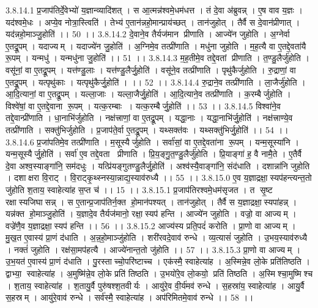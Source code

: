 3.8.14.1
प्र॒जाप॑तिर्दे॒वेभ्यो॑ य॒ज्ञान्व्यादि॑शत् । स आ॒त्मन्न॑श्वमे॒धम॑धत्त । तं दे॒वा अ॑ब्रुवन्न् । ए॒ष वाव य॒ज्ञः । यद॑श्वमे॒धः । अप्ये॒व नोत्रा॒स्त्विति॑ । तेभ्य॑ ए॒तान॑न्नहो॒मान्प्राय॑च्छत् । तान॑जुहोत् । तैर्वै स दे॒वान॑प्रीणात् । यद॑न्नहो॒माञ्जु॒होति॑ ।। 50 ।।
3.8.14.2
दे॒वाने॒व तैर्यज॑मान प्रीणाति । आज्ये॑न जुहोति । अ॒ग्नेर्वा ए॒तद्रू॒पम् । यदाज्यम् । यदाज्ये॑न जु॒होति॑ । अ॒ग्निमे॒व तत्प्री॑णाति । मधु॑ना जुहोति । म॒ह॒त्यै वा ए॒तद्दे॒वता॑यै रू॒पम् । यन्मधु॑ । यन्मधु॑ना जु॒होति॑ ।। 51 ।।
3.8.14.3
म॒ह॒तीमे॒व तद्दे॒वतां प्रीणाति । त॒ण्डु॒लैर्जु॑होति । वसू॑नां॒ वा ए॒तद्रू॒पम् । यत्त॑ण्डु॒लाः । यत्त॑ण्डु॒लैर्जु॒होति॑ । वसू॑ने॒व तत्प्री॑णाति । पृथु॑कैर्जुहोति । रु॒द्राणां॒ वा ए॒तद्रू॒पम् । यत्पृथु॑काः । यत्पृथु॑कैर्जु॒होति॑ । ।। 52 ।।
3.8.14.4
रु॒द्राने॒व तत्प्री॑णाति । ला॒जैर्जु॑होति । आ॒दि॒त्यानां॒ वा ए॒तद्रू॒पम् । यल्ला॒जाः । यल्ला॒जैर्जु॒होति॑ । आ॒दि॒त्याने॒व तत्प्री॑णाति । क॒रम्बैर्जुहोति । विश्वे॑षां॒ वा ए॒तद्दे॒वाना॑ रू॒पम् । यत्क॒रम्बाः । यत्क॒रम्बैर्जु॒होति॑ ।। 53 ।।
3.8.14.5
विश्वा॑ने॒व तद्दे॒वान्प्री॑णाति । धा॒नाभि॑र्जुहोति । नक्ष॑त्त्राणां॒ वा ए॒तद्रू॒पम् । यद्धा॒नाः । यद्धा॒नाभि॑र्जु॒होति॑ । नक्ष॑त्त्राण्ये॒व तत्प्री॑णाति । सक्तु॑भिर्जुहोति । प्र॒जाप॑ते॒र्वा ए॒तद्रू॒पम् । यथ्सक्त॑वः । यथ्सक्तु॑भिर्जु॒होति॑ ।। 54 ।।
3.8.14.6
प्र॒जा॑पतिमे॒व तत्प्री॑णाति । म॒सूस्यैर्जुहोति । सर्वा॑सां॒ वा ए॒तद्दे॒वता॑ना रू॒पम् । यन्म॒सूस्या॑नि । यन्म॒सूस्यैर्जु॒होति॑ । सर्वा॑ ए॒व तद्दे॒वता प्रीणाति । प्रि॒य॒ङ्गु॒त॒ण्डु॒लैर्जु॑होति । प्रि॒याङ्गा॑ ह॒ वै नामै॒ते । ए॒तैर्वै दे॒वा अश्व॒स्याङ्गा॑नि॒ सम॑दधुः । यत्प्रि॑यङ्गुतण्डु॒लैर्जु॒होति॑ । अश्व॑स्यै॒वाङ्गा॑नि॒ संद॑धाति । दशान्ना॑नि जुहोति । दशाक्षरा वि॒राट् । वि॒राट्कृ॒थ्स्नस्या॒न्नाद्य॒स्याव॑रुध्यै ।। 55 ।।
3.8.15.0
ए॒व य॒ज्ञाद्रक्षा॒॒स्यप॑हन्त्यन्त॒तो जु॑होति श॒ताय॒ स्वाहेत्या॑ह स॒प्त च॑ ।। 15 ।।
3.8.15.1
प्र॒जाप॑तिरश्वमे॒धम॑सृजत । त सृ॒ष्ट रक्षा॑स्यजिघासन्न् । स ए॒तान्प्र॒जाप॑तिर्न॒क्त हो॒मान॑पश्यत् । तान॑जुहोत् । तैर्वै स य॒ज्ञाद्रक्षा॒॒स्यपा॑हन्न् । यन्न॑क्त हो॒माञ्जु॒होति॑ । य॒ज्ञादे॒व तैर्यज॑मानो॒ रक्षा॒॒स्यप॑ हन्ति । आज्ये॑न जुहोति । वज्रो॒ वा आज्यम् । वज्रे॑णै॒व य॒ज्ञाद्रक्षा॒॒स्यप॑ हन्ति ।। 56 ।।
3.8.15.2
आज्य॑स्य प्रति॒पदं॑ करोति । प्रा॒णो वा आज्यम् । मु॒ख॒त ए॒वास्य॑ प्रा॒णं द॑धाति । अ॒न्न॒हो॒माञ्जु॑होति । शरी॑रवदे॒वाव॑ रुन्धे । व्य॒त्यासं॑ जुहोति । उ॒भय॒स्याव॑रुध्यै । नक्तं॑ जुहोति । रक्ष॑सा॒मप॑हत्यै । आज्ये॑नान्त॒तो जु॑होति ।। 57 ।।
3.8.15.3
प्रा॒णो वा आज्यम् । उ॒भ॒यत॑ ए॒वास्य॑ प्रा॒णं द॑धाति । पु॒रस्ताच्चो॒परि॑ष्टाच्च । एक॑स्मै॒ स्वाहेत्या॑ह । अ॒स्मिन्ने॒व लो॒के प्रति॑तिष्ठति । द्वाभ्या॒॒ स्वाहेत्या॑ह । अ॒मुष्मि॑न्ने॒व लो॒के प्रति॑ तिष्ठति । उ॒भयो॑रे॒व लो॒कयो॒ प्रति॑ तिष्ठति । अ॒स्मिश्चा॒मुष्मि॑श्च । श॒ताय॒ स्वाहेत्या॑ह । श॒तायु॒र्वै पुरु॑षश्श॒तवीर्यः । आयु॑रे॒व वी॒र्य॑मव॑ रुन्धे । स॒हस्रा॑य॒ स्वाहेत्या॑ह । आयु॒र्वै स॒हस्रम् । आयु॑रे॒वाव॑ रुन्धे । सर्व॑स्मै॒ स्वाहेत्या॑ह । अप॑रिमितमे॒वाव॑ रुन्धे ।। 58 ।।
